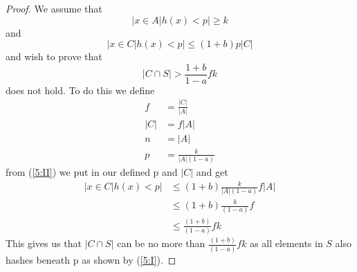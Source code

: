 \begin{proof}
    We assume that
    \begin{equation}\label{5:I}
        |{x \in A | h(x) < p}| \ge k 
    \end{equation}
    and
    \begin{equation}\label{5:II}
        |{x \in C | h(x) < p}| \le (1 + b)p|C| 
    \end{equation}
    and wish to prove that
    \begin{equation*}
        |C \cap S| > \frac{1 + b}{1 - a}fk
    \end{equation*}
    does not hold. To do this we define
    \begin{align*}
        f &= \frac{|C|}{|A|} \\
        |C| &= f |A|\\
        n &= |A|\\
        p &= \frac{k}{|A|(1-a)}
    \end{align*}
    from (\ref{5:II}) we put in our defined p and $|C|$ and get
    \begin{align*}\label{5:II}
        |{x \in C | h(x) < p}| &\le (1 + b)\frac{k}{|A|(1-a)} f |A|\\
         &\le (1 + b)\frac{k}{(1-a)} f\\
         &\le \frac{(1 + b)}{(1-a)} fk 
    \end{align*}
    This gives us that $|C \cap S|$ can be no more than
    $\frac{(1 + b)}{(1-a)} fk$ as all elements in $S$ also hashes beneath p as shown by (\ref{5:I}).
\end{proof}
